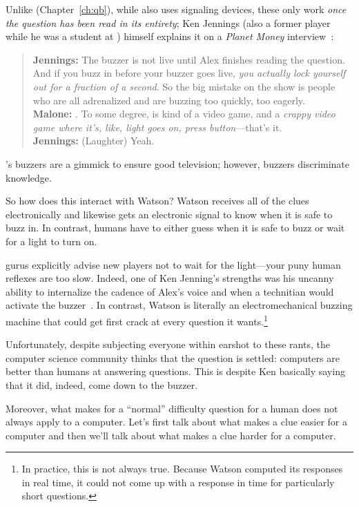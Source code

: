Unlike \qb{} (Chapter~\ref{ch:qb}), while \jeopardy{} also uses
signaling devices, these only work \emph{once the question has been
  read in its entirety}; Ken Jennings (also a former \qb{} player while he was a student at
) himself explains it on a \textit{Planet Money}
interview~\citep{malone-19}:
\begin{quote}
{\bf Jennings:} The buzzer is
    not live until Alex finishes reading the question. And if you buzz
    in before your buzzer goes live, \emph{you actually lock yourself out
    for a fraction of a second}. So the big mistake on the show is
    people who are all adrenalized and are buzzing too quickly, too
    eagerly. \\
{\bf Malone:} . To some degree, \jeopardy{} is kind of a video game, and a \emph{crappy video game where it's, like, light goes on, press button}---that's it. \\
{\bf Jennings:} (Laughter) Yeah. \\
\end{quote}
\jeopardy{}'s buzzers are a gimmick to ensure good television; however, \qb{} buzzers discriminate knowledge.

So how does this interact with Watson?
%
Watson receives all of the clues electronically and likewise gets an electronic signal to know when it is safe to buzz in.
%
In contrast, humans have to either guess when it is safe to buzz or
wait for a light to turn on.


\jeopardy{} gurus explicitly advise new players not to wait for the light---your puny human reflexes are too slow.
%
Indeed, one of Ken Jenning's strengths was his uncanny ability to
internalize the cadence of Alex's voice and when a technitian would
activate the buzzer~\citep{jennings-06}.
%
In contrast, Watson is literally an electromechanical buzzing machine
that could get first crack at every question it wants.\footnote{In
practice, this is not always true.  Because Watson computed its
responses in real time, it could not come up with a response in time
for particularly short questions.}

Unfortunately, despite subjecting everyone within earshot to these
rants, the computer science community thinks that the question is
settled: computers are better than humans at answering questions.
%
This is despite Ken basically saying that it did, indeed, come down to
the buzzer.

Moreover, what makes for a ``normal'' difficulty question for a human
does not always apply to a computer.
%
Let's first talk about what makes a clue easier for a computer and
then we'll talk about what makes a clue harder for a computer.

